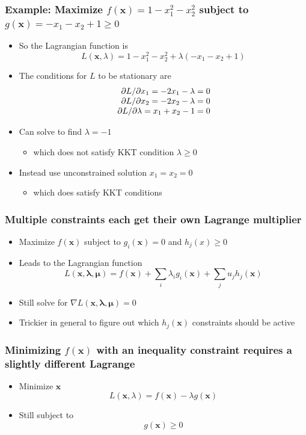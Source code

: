 \documentclass[12pt,notes,mathserif]{beamer}
\begin{document}
\begin{frame}[c]
\frametitle{Example: Maximize $f(\mathbf{x})=1-x_1^2-x_2^2$ subject to $g(\mathbf{x})=-x_1-x_2+1\geqslant{}0$}
\begin{itemize}
\item So the Lagrangian function is 
\[
L(\mathbf{x},\lambda)=1-x_1^2-x_2^2+\lambda(-x_1-x_2+1)
\]
\item The conditions for $L$ to be stationary are 
\[
\begin{array}{r@{~}l}
\partial L/\partial x_1=-2x_1-\lambda=0\\
\partial L/\partial x_2=-2x_2-\lambda=0\\
\partial L/\partial \lambda=x_1+x_2-1=0\\
\end{array}
\]
\item Can solve to find $\lambda=-1$
\begin{itemize}
\item which does not satisfy KKT condition $\lambda \geqslant{}0$
\end{itemize}
\item Instead use unconstrained solution $x_1=x_2=0$
\begin{itemize}
\item which does satisfy KKT conditions
\end{itemize}
\end{itemize}
\end{frame}


\begin{frame}[c]
\frametitle{Multiple constraints each get their own Lagrange multiplier}
\begin{itemize}
\item Maximize $f(\mathbf{x})$ subject to $g_i(\mathbf{x})= 0$ and $h_j(x)\geqslant{}0$
\item Leads to the Lagrangian function
\[
L(\mathbf{x,\lambda,\mu})=f(\mathbf{x})+\sum_i \lambda_ig_i(\mathbf{x})+\sum_ju_jh_j(\mathbf{x})
\]
\item Still solve for $\nabla L(\mathbf{x,\lambda,\mu})= 0$
\item Trickier in general to figure out which $h_j(\mathbf{x})$ constraints should be active
\end{itemize}
\end{frame}



\begin{frame}[c]
\frametitle{Minimizing $f(\mathbf{x})$ with an inequality constraint requires a slightly different Lagrange} 
\begin{itemize}
\item Minimize \wrt $\mathbf{x}$
\[
L(\mathbf{x},\lambda)=f(\mathbf{x})-\lambda g(\mathbf{x})
\]
\item Still subject to
\[
g(\mathbf{x})\geqslant{}0
\]
\end{itemize}
\end{frame}
\end{document}
